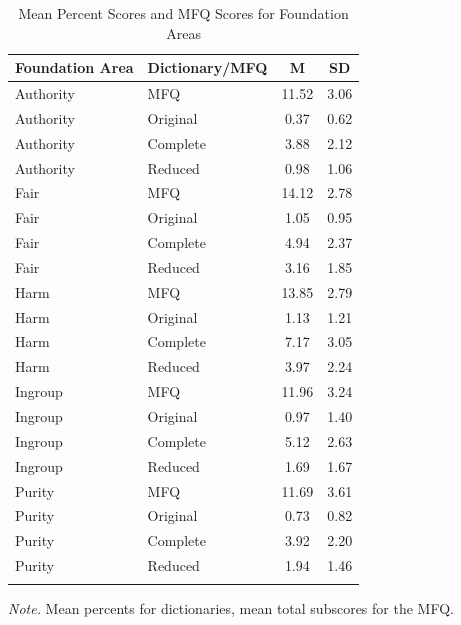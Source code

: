 \documentclass[
  man,floatsintext]{apa6}
\begin{document}
\begin{table}[h]

\begin{center}
\begin{threeparttable}

\caption{\label{tab:tab-mtmm}Mean Percent Scores and MFQ Scores for Foundation Areas}

\footnotesize{

\begin{tabular}{llcc}
\toprule
Foundation Area & Dictionary/MFQ & M & SD\\
\midrule
Authority & MFQ & 11.52 & 3.06\\
Authority & Original & 0.37 & 0.62\\
Authority & Complete & 3.88 & 2.12\\
Authority & Reduced & 0.98 & 1.06\\
Fair & MFQ & 14.12 & 2.78\\
Fair & Original & 1.05 & 0.95\\
Fair & Complete & 4.94 & 2.37\\
Fair & Reduced & 3.16 & 1.85\\
Harm & MFQ & 13.85 & 2.79\\
Harm & Original & 1.13 & 1.21\\
Harm & Complete & 7.17 & 3.05\\
Harm & Reduced & 3.97 & 2.24\\
Ingroup & MFQ & 11.96 & 3.24\\
Ingroup & Original & 0.97 & 1.40\\
Ingroup & Complete & 5.12 & 2.63\\
Ingroup & Reduced & 1.69 & 1.67\\
Purity & MFQ & 11.69 & 3.61\\
Purity & Original & 0.73 & 0.82\\
Purity & Complete & 3.92 & 2.20\\
Purity & Reduced & 1.94 & 1.46\\
\bottomrule
\addlinespace
\end{tabular}

}

\begin{tablenotes}[para]
\normalsize{\textit{Note.} Mean percents for dictionaries, mean total subscores for the MFQ.}
\end{tablenotes}

\end{threeparttable}
\end{center}

\end{table}
\end{document}
